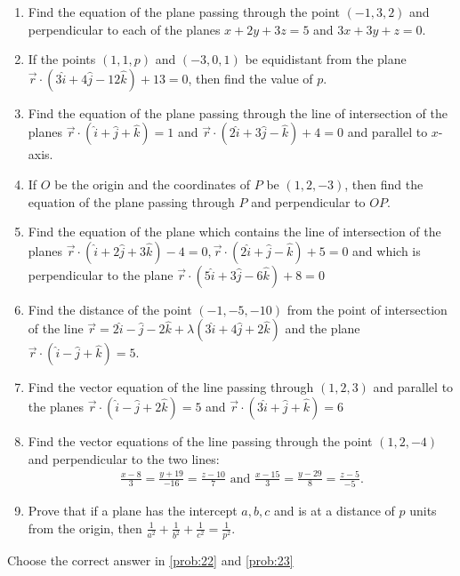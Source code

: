 \documentclass{article}
\theoremstyle{remark}
\begin{document}
\begin{enumerate}
\item Find the equation of the plane passing through the point $(-1,3,2)$ and perpendicular to each of the planes $x+2y+3z=5$ and $3x+3y+z=0$.
\item If the points $(1,1,p)$ and $(-3,0,1)$ be equidistant from the plane $\overrightarrow{r}\cdot(3\hat{i}+4\hat{j}-12\hat{k})+13=0$, then find the value of $p$.
\item Find the equation of the plane passing through the line of intersection of the planes  $\overrightarrow{r}\cdot(\hat{i}+\hat{j}+\hat{k})=1$ and $\overrightarrow{r}\cdot(2\hat{i}+3\hat{j}-\hat{k})+4=0$ and parallel to $x$-axis.
\item If $O$ be the origin and the coordinates of $P$ be $(1,2,-3)$, then find the equation of the plane passing through $P$ and perpendicular to $OP$.
\item Find the equation of the plane which contains the line of intersection of the planes $\overrightarrow{r}\cdot(\hat{i}+2\hat{j}+3\hat{k})-4=0, \overrightarrow{r} \cdot  (2\hat{i}+\hat{j}-\hat{k})+5=0$ and which is perpendicular to the plane $\overrightarrow{r}\cdot(5\hat{i}+3\hat{j}-6\hat{k})+8=0$
\item Find the distance of the point $(-1,-5,-10)$ from the point of intersection of the line $\overrightarrow{r}=2\hat{i}-\hat{j}-2\hat{k}+\lambda(3\hat{i}+4\hat{j}+2\hat{k})$ and the plane $\overrightarrow{r}\cdot(\hat{i}-\hat{j}+\hat{k})=5$.
\item Find the vector equation of the line passing through $(1,2,3)$ and parallel to the planes $\overrightarrow{r} \cdot (\hat{i}-\hat{j}+2\hat{k})=5$ and $\overrightarrow{r} \cdot (3\hat{i}+\hat{j}+\hat{k})=6$ 
\item Find the vector equations of the line passing through the point $(1,2,-4)$ and perpendicular to the two lines:
\begin{align}
\frac{x-8}{3}=\frac{y+19}{-16}=\frac{z-10}{7}\text{ and } \frac{x-15}{3}=\frac{y-29}{8}=\frac{z-5}{-5}.
\end{align}
\item Prove that if a plane has the intercept $a,b,c$ and is at a distance of $p$ units  from the origin, then $\frac{1}{a^2}+\frac{1}{b^2}+\frac{1}{c^2}=\frac{1}{p^2}.$
\end{enumerate}
Choose the correct answer in \ref{prob:22} and \ref{prob:23}
\end{document}

